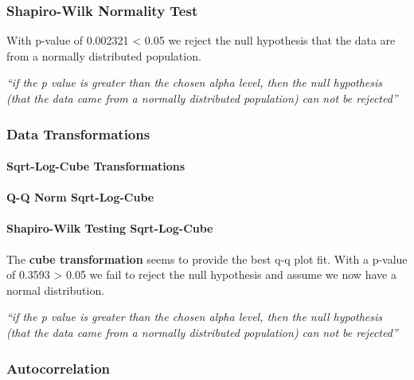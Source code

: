 \documentclass[
  letterpaper,
  DIV=11,
  numbers=noendperiod]{scrartcl}
\let\oldparagraph\paragraph
\renewcommand{\paragraph}[1]{\oldparagraph{#1}\mbox{}}
\begin{document}
\hypertarget{shapiro-wilk-normality-test}{%
\subsubsection{Shapiro-Wilk Normality
Test}\label{shapiro-wilk-normality-test}}

With p-value of 0.002321 \textless{} 0.05 we reject the null hypothesis
that the data are from a normally distributed population.

\emph{``if the p value is greater than the chosen alpha level, then the
null hypothesis (that the data came from a normally distributed
population) can not be rejected''}

\hypertarget{data-transformations}{%
\subsubsection{Data Transformations}\label{data-transformations}}

\hypertarget{sqrt-log-cube-transformations}{%
\paragraph{Sqrt-Log-Cube
Transformations}\label{sqrt-log-cube-transformations}}

\hypertarget{q-q-norm-sqrt-log-cube}{%
\paragraph{Q-Q Norm Sqrt-Log-Cube}\label{q-q-norm-sqrt-log-cube}}

\hypertarget{shapiro-wilk-testing-sqrt-log-cube}{%
\paragraph{Shapiro-Wilk Testing
Sqrt-Log-Cube}\label{shapiro-wilk-testing-sqrt-log-cube}}

The \textbf{cube transformation} seems to provide the best q-q plot fit.
With a p-value of 0.3593 \textgreater{} 0.05 we fail to reject the null
hypothesis and assume we now have a normal distribution.

\emph{``if the p value is greater than the chosen alpha level, then the
null hypothesis (that the data came from a normally distributed
population) can not be rejected''}

\hypertarget{autocorrelation-1}{%
\subsubsection{Autocorrelation}\label{autocorrelation-1}}
\end{document}
